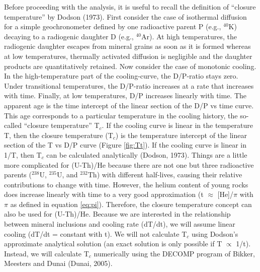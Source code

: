 \documentclass{article}
\begin{document}
Before  proceeding with  the  analysis,  it is  useful  to recall  the
definition  of  ``closure   temperature''  by  Dodson  (1973).   First
consider the case of  isothermal diffusion for a simple geochronometer
defined by  one radioactive  parent P (e.g.,  $^{40}$K) decaying  to a
radiogenic daughter  D (e.g.,  $^{40}$Ar).  At high  temperatures, the
radiogenic  daughter escapes  from mineral  grains  as soon  as it  is
formed whereas  at low temperatures, thermally  activated diffusion is
negligible and the daughter products are quantitatively retained.  Now
consider the case of  monotonic cooling.  In the high-temperature part
of the  cooling-curve, the  D/P-ratio stays zero.   Under transitional
temperatures, the  D/P-ratio increases at  a rate that  increases with
time.  Finally, at low temperatures, D/P increases linearly with time.
The apparent  age is the time  intercept of the linear  section of the
D/P vs time  curve.  This age corresponds to  a particular temperature
in the  cooling history, the so-called ``closure  temperature'' T$_c$. 
If the cooling curve is linear  in the temperature T, then the closure
temperature (T$_c$) is the temperature intercept of the linear section
of the T vs D/P curve  (Figure \ref{fig:Tt}).  If the cooling curve is
linear  in 1/T,  then T$_c$  can be  calculated  analytically (Dodson,
1973).   Things are a  little more  complicated for  (U-Th)/He because
there are not one but three radioactive parents ($^{238}$U, $^{235}$U,
and  $^{232}$Th)  with different  half-lives,  causing their  relative
contributions  to change with  time.  However,  the helium  content of
young  rocks  does  increase  linearly   with  time  to  a  very  good
approximation  (t  $\approx$  [He]/$\pi$  with  $\pi$  as  defined  in
equation \ref{eq:pi}). Therefore,  the closure temperature concept can
also  be  used  for  (U-Th)/He.   Because we  are  interested  in  the
relationship between  mineral inclusions and cooling  rate (dT/dt), we
will assume  linear cooling  (dT/dt = constant  with t).  We  will not
calculate  T$_c$ using  Dodson's approximate  analytical  solution (an
exact solution is only possible if T $\propto$ 1/t).  Instead, we will
calculate T$_c$ numerically using the DECOMP program of Bikker,
Meesters and Dunai (Dunai, 2005).\\
\end{document}
